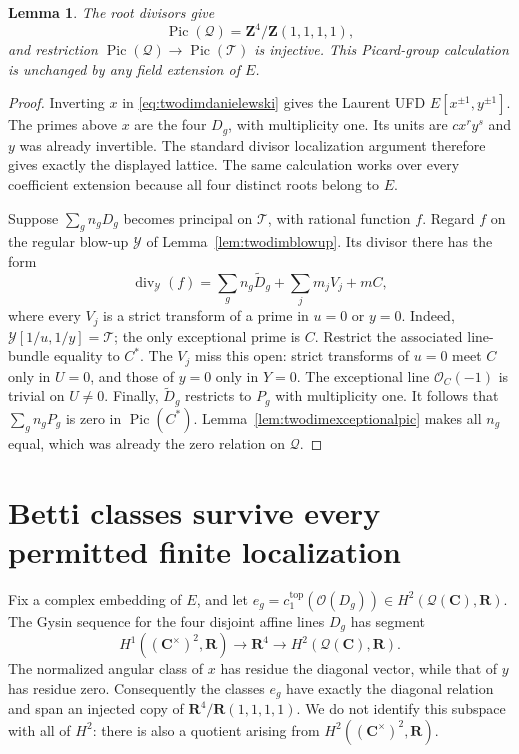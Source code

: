 \documentclass[11pt,a4paper]{article}
\newtheorem{lemma}[theorem]{Lemma}
\theoremstyle{remark}
\newcommand{\Z}{\mathbf Z}
\newcommand{\R}{\mathbf R}
\newcommand{\C}{\mathbf C}
\newcommand{\OO}{\mathcal O}
\newcommand{\Pic}{\operatorname{Pic}}
\newcommand{\divisor}{\operatorname{div}}
\begin{document}
\begin{lemma}\label{lem:twodimpicinjection}
The root divisors give
\[
 \Pic(\mathcal Q)=\Z^4/\Z(1,1,1,1),
\]
and restriction $\Pic(\mathcal Q)\to\Pic(\mathcal T)$ is injective.
This Picard-group calculation is unchanged by any field extension of $E$.
\end{lemma}
\begin{proof}
Inverting $x$ in \eqref{eq:twodimdanielewski} gives the Laurent UFD
$E[x^{\pm1},y^{\pm1}]$. The primes above $x$ are the four $D_g$,
with multiplicity one. Its units are $cx^ry^s$ and $y$ was already
invertible. The standard divisor localization argument therefore
gives exactly the displayed lattice. The same calculation works over
every coefficient extension because all four distinct roots belong
to $E$.

Suppose $\sum_g n_gD_g$ becomes principal on $\mathcal T$, with
rational function $f$. Regard $f$ on the regular blow-up
$\mathcal Y$ of Lemma~\ref{lem:twodimblowup}. Its divisor there has
the form
\[
 \divisor_{\mathcal Y}(f)=\sum_g n_g\widetilde D_g
                    +\sum_j m_jV_j+mC,
\]
where every $V_j$ is a strict transform of a prime in $u=0$ or $y=0$.
Indeed, $\mathcal Y[1/u,1/y]=\mathcal T$; the only exceptional prime
is $C$. Restrict the associated line-bundle equality to $C^*$.
The $V_j$ miss this open: strict transforms of $u=0$ meet $C$ only
in $U=0$, and those of $y=0$ only in $Y=0$. The exceptional line
$\OO_C(-1)$ is trivial on $U\ne0$. Finally,
$\widetilde D_g$ restricts to $P_g$ with multiplicity one.
It follows that $\sum_g n_gP_g$ is zero in $\Pic(C^*)$.
Lemma~\ref{lem:twodimexceptionalpic} makes all $n_g$ equal, which
was already the zero relation on $\mathcal Q$.
\end{proof}

\section{Betti classes survive every permitted finite localization}

Fix a complex embedding of $E$, and let
$e_g=c_1^{\mathrm{top}}(\OO(D_g))\in H^2(\mathcal Q(\C),\R)$.
The Gysin sequence for the four disjoint affine lines $D_g$ has segment
\[
 H^1((\C^\times)^2,\R)\longrightarrow\R^4
       \longrightarrow H^2(\mathcal Q(\C),\R).
\]
The normalized angular class of $x$ has residue the diagonal vector,
while that of $y$ has residue zero. Consequently the classes $e_g$ have exactly the
diagonal relation and span an injected copy of $\R^4/\R(1,1,1,1)$.
We do not identify this subspace with all of $H^2$: there is also a
quotient arising from $H^2((\C^\times)^2,\R)$.
\end{document}
